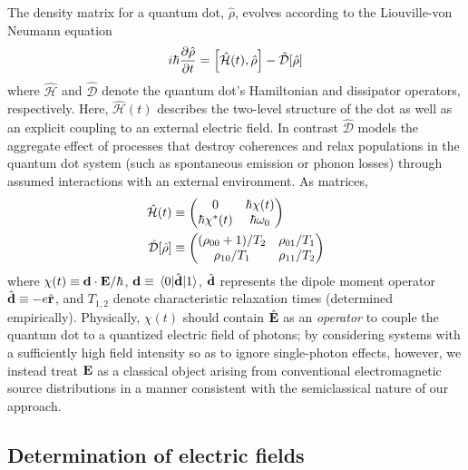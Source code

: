 \documentclass[conference]{IEEEtran}
\begin{document}
The density matrix for a quantum dot, $\hat{\rho}$, evolves according to the Liouville-von Neumann equation
\begin{equation}
  i \hbar \pdv{\hat{\rho}}{t} = \commutator{\hat{\mathcal{H}}(t)}{\hat{\rho}} - \hat{\mathcal{D}}\qty[\hat{\rho}]
  \label{eq:liouville}
\end{equation}
where $\hat{\mathcal{H}}$ and $\hat{\mathcal{D}}$ denote the quantum dot's Hamiltonian and dissipator operators, respectively\cite{Breuer2002}.
Here, $\hat{\mathcal{H}}(t)$ describes the  two-level structure of the dot as well as an explicit coupling to an external electric field.
In contrast $\hat{\mathcal{D}}$ models the aggregate effect of processes that destroy coherences and relax populations in the quantum dot system (such as spontaneous emission or phonon losses) through assumed interactions with an external environment.
As matrices,
\begin{subequations}
  \begin{align}
    \hat{\mathcal{H}}(t) &\equiv \mqty(0 & \hbar \chi(t) \\ \hbar \chi^*(t) & \hbar \omega_0) \label{eq:hamiltonian} \\
    \hat{\mathcal{D}}[\hat{\rho}] &\equiv \mqty((\rho_{00} + 1)/T_2 & \rho_{01}/T_1 \\ \rho_{10}/T_1 & \rho_{11}/T_2) \label{eq:dissipator}
  \end{align}
\end{subequations}
where $\chi(t) \equiv \vb{d} \cdot \vb{E}/\hbar$, $\vb{d} \equiv \matrixel{0}{\hat{\vb{d}}}{1}$, $\hat{\vb{d}}$ represents the dipole moment operator $\hat{\vb{d}} \equiv -e \hat{\vb{r}}$, and $T_{1,2}$ denote characteristic relaxation times (determined empirically).
Physically, $\chi(t)$ should contain $\hat{\vb{E}}$ as an \emph{operator} to couple the quantum dot to a quantized electric field of photons; by considering systems with a sufficiently high field intensity so as to ignore single-photon effects, however, we instead treat $\vb{E}$ as a classical object arising from conventional electromagnetic source distributions in a manner consistent with the semiclassical nature of our approach.

\subsection{Determination of electric fields}
\end{document}
